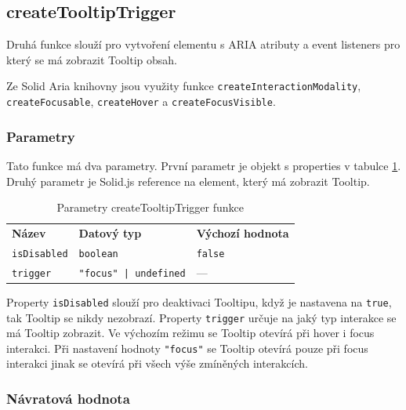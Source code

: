 \subsection{createTooltipTrigger}

Druhá funkce slouží pro vytvoření elementu s ARIA atributy a event listeners pro který se má zobrazit Tooltip obsah.

Ze Solid Aria knihovny jsou využity funkce \texttt{createInteractionModality}, \texttt{createFocusable}, \texttt{createHover} a \texttt{createFocusVisible}.

\subsubsection{Parametry}

Tato funkce má dva parametry.
První parametr je objekt s properties v tabulce \ref{table:tooltip-trigger-params}.
Druhý parametr je Solid.js reference na element, který má zobrazit Tooltip.

\begin{table}[ht]
    \begin{ctucolortab}
        \begin{tabularx}{\textwidth}{X X X}
            \bfseries Název     & \bfseries Datový typ         & \bfseries Výchozí hodnota \\\Midrule{}
            \texttt{isDisabled} & \texttt{boolean}             & \texttt{false}            \\
            \texttt{trigger}    & \texttt{"focus" | undefined} & ---
        \end{tabularx}
    \end{ctucolortab}
    \caption{Parametry createTooltipTrigger funkce}
    \label{table:tooltip-trigger-params}
\end{table}

Property \texttt{isDisabled} slouží pro deaktivaci Tooltipu, když je nastavena na \texttt{true}, tak Tooltip se nikdy nezobrazí.
Property \texttt{trigger} určuje na jaký typ interakce se má Tooltip zobrazit.
Ve výchozím režimu se Tooltip otevírá při hover i focus interakci.
Při nastavení hodnoty \texttt{"focus"} se Tooltip otevírá pouze při focus interakci jinak se otevírá při všech výše zmíněných interakcích.

\subsubsection{Návratová hodnota}

